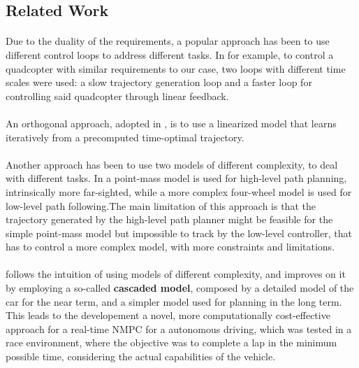 \documentclass[a4paper, onecolumn, 11pt]{article}
\begin{document}
\subsection*{Related Work}
\paragraph*{} Due to the duality of the requirements, a popular approach has been
to use different control loops to address different tasks. In \cite{Gros2007}
for example, to control a quadcopter with similar requirements to our case, two
loops with different time scales were used: a slow trajectory generation loop
and a faster loop for controlling said quadcopter through linear feedback.
\paragraph*{} An orthogonal approach, adopted in \cite{rosolia}, is to use a
linearized model that learns iteratively from a precomputed time-optimal
trajectory.
\paragraph*{} Another approach has been to use two models of different 
complexity, to deal with different tasks. In \cite{Gao2010} a point-mass model
is used for high-level path planning, intrinsically more far-sighted, while a
more complex four-wheel model is used for low-level path following.The main
limitation of this approach is that the trajectory generated by the high-level
path planner might be feasible for the simple point-mass model but impossible to
track by the low-level controller, that has to control a more complex model,
with more constraints and limitations.
\paragraph*{}\cite{paper} follows the intuition of using models of different complexity, and
improves on it by employing a so-called \textbf{cascaded model}, composed by a
detailed model of the car for the near term, and a simpler model used for
planning in the long term. This leads to the developement a novel, more
computationally cost-effective approach for a real-time NMPC for a autonomous
driving, which was tested in a race environment, where the objective was to
complete a lap in the minimum possible time, considering the actual capabilities
of the vehicle. 
\end{document}
